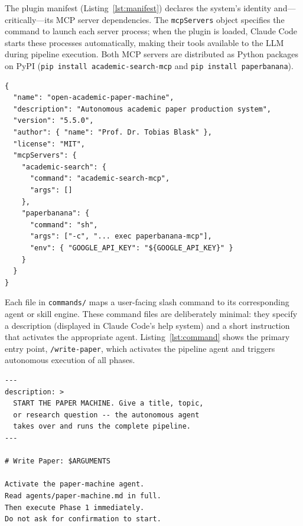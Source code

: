 \documentclass{article}
\begin{document}
The plugin manifest (Listing~\ref{lst:manifest}) declares the system's identity and---critically---its MCP server dependencies. The \texttt{mcpServers} object specifies the command to launch each server process; when the plugin is loaded, Claude Code starts these processes automatically, making their tools available to the LLM during pipeline execution. Both MCP servers are distributed as Python packages on PyPI (\texttt{pip install academic-search-mcp} and \texttt{pip install paperbanana}).

\begin{lstlisting}[caption={Plugin manifest (\texttt{plugin.json}) declaring two MCP server dependencies. The \texttt{mcpServers} object maps server names to launch commands; Claude Code starts these processes when the plugin is loaded.},label={lst:manifest},float=t]
{
  "name": "open-academic-paper-machine",
  "description": "Autonomous academic paper production system",
  "version": "5.5.0",
  "author": { "name": "Prof. Dr. Tobias Blask" },
  "license": "MIT",
  "mcpServers": {
    "academic-search": {
      "command": "academic-search-mcp",
      "args": []
    },
    "paperbanana": {
      "command": "sh",
      "args": ["-c", "... exec paperbanana-mcp"],
      "env": { "GOOGLE_API_KEY": "${GOOGLE_API_KEY}" }
    }
  }
}
\end{lstlisting}

Each file in \texttt{commands/} maps a user-facing slash command to its corresponding agent or skill engine. These command files are deliberately minimal: they specify a description (displayed in Claude Code's help system) and a short instruction that activates the appropriate agent. Listing~\ref{lst:command} shows the primary entry point, \texttt{/write-paper}, which activates the pipeline agent and triggers autonomous execution of all phases.

\begin{lstlisting}[caption={The \texttt{/write-paper} command file---the primary entry point that activates the pipeline agent. The \texttt{\$ARGUMENTS} placeholder captures the user's research topic.},label={lst:command},float=t]
---
description: >
  START THE PAPER MACHINE. Give a title, topic,
  or research question -- the autonomous agent
  takes over and runs the complete pipeline.
---

# Write Paper: $ARGUMENTS

Activate the paper-machine agent.
Read agents/paper-machine.md in full.
Then execute Phase 1 immediately.
Do not ask for confirmation to start.
\end{lstlisting}
\end{document}
